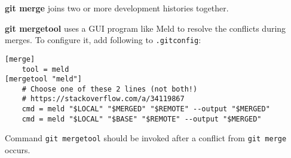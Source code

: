 %

\textbf{git merge} joins two or more development histories together.

\textbf{git mergetool} uses a GUI program like Meld to resolve the conflicts during merges.
To configure it, add following to \texttt{.gitconfig}:
\begin{verbatim}
[merge]
    tool = meld
[mergetool "meld"]
    # Choose one of these 2 lines (not both!)
    # https://stackoverflow.com/a/34119867
    cmd = meld "$LOCAL" "$MERGED" "$REMOTE" --output "$MERGED"
    cmd = meld "$LOCAL" "$BASE" "$REMOTE" --output "$MERGED"
\end{verbatim}

Command \texttt{git mergetool} should be invoked after a conflict from \texttt{git merge} occurs.

%